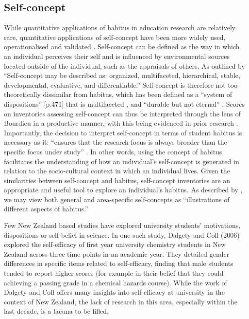 \subsection*{Self-concept}
\label{selfconcept}
While quantitative applications of habitus in education research are relatively rare, quantitative applications of self-concept have been more widely used, operationalised and validated \cite{marsh2014academic,hattie2014self}. Self-concept can be defined as the way in which an individual perceives their self \cite{rosenberg1979conceiving,shavelson1976self} and is influenced by environmental sources located outside of the individual, such as the appraisals of others. As outlined by \cite[p.488]{shavelson1976self} ``Self-concept may be described as: organized, multifaceted, hierarchical, stable, developmental,
evaluative, and differentiable.'' Self-concept is therefore not too theoretically dissimilar from habitus, which has been defined as a ``system of dispositions'' [p.471] that is multifaceted \cite{Nash1999}, and ``durable but not eternal'' \cite{Bourdieu1984}. Scores on inventories assessing self-concept can thus be interpreted through the lens of Bourdieu in a productive manner, with this being evidenced in prior research \cite{dumais2002cultural}.  Importantly, the decision to interpret self-concept in terms of student habitus is necessary as it: ``ensures that the research focus is always broader than the specific focus under study'' \cite{Reay_2004}. In other words, using the concept of habitus facilitates the understanding of how an individual's self-concept is generated in relation to the socio-cultural context in which an individual lives. Given the similarities between self-concept and habitus, self-concept inventories are an appropriate and useful tool to explore an individual's habitus. As described by \cite[p.395]{bodovski2014adolescents}, we may view both general and area-specific self-concepts as ``illustrations of different aspects of habitus.''  

Few New Zealand based studies have explored university students' motivations, dispositions or self-belief in science. In one such study, Dalgety and Coll (2006) \cite{dalgety2006exploring} explored the self-efficacy of first year university chemistry students in New Zealand across three time points in an academic year. They detailed gender differences in specific items related to self-efficacy, finding that male students tended to report higher scores (for example in their belief that they could achieving a passing grade in a chemical hazards course). While the work of Dalgety and Coll offers many insights into self-efficacy at university in the context of New Zealand, the lack of research in this area, especially within the last decade, is a lacuna to be filled. 


